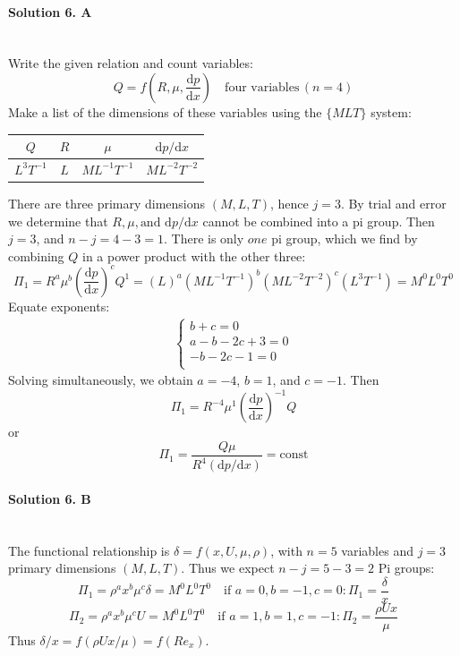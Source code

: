 \documentclass[a4paper]{article}
\begin{document}
\newpage
\paragraph{Solution 6. A}\hfill \\
Write the given relation and count variables:
\begin{equation*}
Q = f(R, \mu, \frac{\mathrm{d}p}{\mathrm{d}x}) \quad \text{four variables} \, (n=4)
\end{equation*}
Make a list of the dimensions of these variables using the $\{MLT\}$ system:
\begin{table}[h]
	\centering
	\begin{tabular}{c|c|c|c}
		\hline
		$Q$ & $R$ & $\mu$ & $\mathrm{d}p/\mathrm{d}x$ \\
		\hline
		$L^3T^{-1}$ & $L$ & $ML^{-1}T^{-1}$ & $ML^{-2}T^{-2}$ \\
		\hline
	\end{tabular}
\end{table}
There are three primary dimensions $(M, L, T)$, hence $j=3$. By trial and error we determine that $R, \mu, \text{and } \mathrm{d}p/\mathrm{d}x$ cannot be combined into a pi group. Then $j=3$, and $n-j = 4-3 =1$. There is only $one$ pi group, which we find by combining $Q$ in a power product with the other three:
\begin{equation*}
\Pi_1 = R^a \mu^b (\frac{\mathrm{d}p}{\mathrm{d}x})^c Q^1 = (L)^a (ML^{-1}T^{-1})^b (ML^{-2}T^{-2})^c (L^3T^{-1}) 
= M^0 L^0 T^0
\end{equation*}
Equate exponents:
\begin{align*}
\begin{cases}
    b +  c     = 0 \\
a - b - 2c + 3 = 0 \\
  - b - 2c - 1 = 0 \\
\end{cases}
\end{align*}
Solving simultaneously, we obtain $a=-4$, $b=1$, and $c=-1$. Then
\begin{equation*}
\Pi_1 = R^{-4} \mu^1 (\frac{\mathrm{d}p}{\mathrm{d}x})^{-1} Q
\end{equation*}
or
\begin{equation*}
\Pi_1 = \frac{Q \mu}{R^4 (\mathrm{d}p/\mathrm{d}x)} = \text{const}
\end{equation*}



\paragraph{Solution 6. B}\hfill \\
The functional relationship is $\delta = f(x, U, \mu, \rho)$, with $n = 5$ variables and $j = 3$ primary dimensions $(M,L,T)$. Thus we expect $n − j = 5 − 3 = 2$ Pi groups:
\begin{equation*}
\Pi_1 = \rho^a x^b \mu^c \delta = M^0 L^0 T^0 \quad \text{if } a=0, b=-1, c=0: \Pi_1=\frac{\delta}{x}
\end{equation*}
\begin{equation*}
\Pi_2 = \rho^a x^b \mu^c U = M^0 L^0 T^0 \quad \text{if } a=1, b=1, c=-1: \Pi_2=\frac{\rho U x}{\mu}
\end{equation*}
Thus $\delta/x = f(\rho U x / \mu) = f(Re_x)$.
\end{document}
